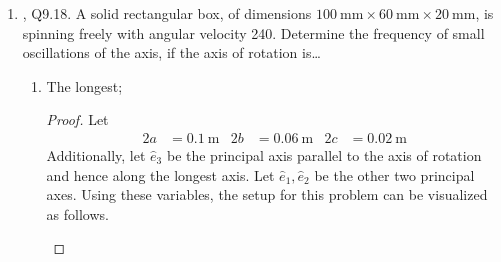 \documentclass[../psets.tex]{subfiles}
\begin{document}
\begin{enumerate}
\begin{proof}
\begin{align*}
            &= \frac{2m}{r^2}\int_0^rr^3\dd{r}\\
            &= \frac{1}{2}mr^2\\
            &= \SI{8e-5}{\kilo\gram\meter\squared}
        \end{align*}
        Therefore, plugging $M,g,R,I_3,\omega$ into the original equation, we obtain
        \begin{equation*}
            \boxed{\Omega = \SI{0.244}{\per\second}}
        \end{equation*}
    \end{proof}
    \pagebreak
    \item \textcite{bib:KibbleBerkshire}, Q9.18. A solid rectangular box, of dimensions $\SI{100}{\milli\meter}\times\SI{60}{\milli\meter}\times\SI{20}{\milli\meter}$, is spinning freely with angular velocity \SI{240}{\rpm}. Determine the frequency of small oscillations of the axis, if the axis of rotation is\dots
    \begin{enumerate}
        \item The longest;
        \begin{proof}
            Let
            \begin{align*}
                2a &= \SI{0.1}{\meter}&
                2b &= \SI{0.06}{\meter}&
                2c &= \SI{0.02}{\meter}
            \end{align*}
            Additionally, let $\hat{e}_3$ be the principal axis parallel to the axis of rotation and hence along the longest axis. Let $\hat{e}_1,\hat{e}_2$ be the other two principal axes. Using these variables, the setup for this problem can be visualized as follows.
            \begin{center}
\end{center}
\end{proof}
\end{enumerate}
\end{enumerate}
\end{document}
